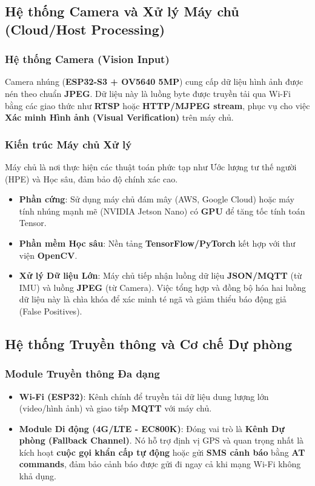 \subsection{Hệ thống Camera và Xử lý Máy chủ (Cloud/Host Processing)}

\subsubsection{Hệ thống Camera (Vision Input)}
Camera nhúng (\textbf{ESP32-S3 + OV5640 5MP}) cung cấp dữ liệu hình ảnh được nén theo chuẩn \textbf{JPEG}. Dữ liệu này là luồng byte được truyền tải qua Wi-Fi bằng các giao thức như \textbf{RTSP} hoặc \textbf{HTTP/MJPEG stream}, phục vụ cho việc \textbf{Xác minh Hình ảnh (Visual Verification)} trên máy chủ.

\subsubsection{Kiến trúc Máy chủ Xử lý}
Máy chủ là nơi thực hiện các thuật toán phức tạp như Ước lượng tư thế người (HPE) và Học sâu, đảm bảo độ chính xác cao.
\begin{itemize}
    \item \textbf{Phần cứng}: Sử dụng máy chủ đám mây (AWS, Google Cloud) hoặc máy tính nhúng mạnh mẽ (NVIDIA Jetson Nano) có \textbf{GPU} để tăng tốc tính toán Tensor.
    \item \textbf{Phần mềm Học sâu}: Nền tảng \textbf{TensorFlow/PyTorch} kết hợp với thư viện \textbf{OpenCV}.
    \item \textbf{Xử lý Dữ liệu Lớn}: Máy chủ tiếp nhận luồng dữ liệu \textbf{JSON/MQTT} (từ IMU) và luồng \textbf{JPEG} (từ Camera). Việc tổng hợp và đồng bộ hóa hai luồng dữ liệu này là chìa khóa để xác minh té ngã và giảm thiểu báo động giả (False Positives).
\end{itemize}

\subsection{Hệ thống Truyền thông và Cơ chế Dự phòng}

\subsubsection{Module Truyền thông Đa dạng}
\begin{itemize}
    \item \textbf{Wi-Fi (ESP32)}: Kênh chính để truyền tải dữ liệu dung lượng lớn (video/hình ảnh) và giao tiếp \textbf{MQTT} với máy chủ.
    \item \textbf{Module Di động (4G/LTE - EC800K)}: Đóng vai trò là \textbf{Kênh Dự phòng (Fallback Channel)}. Nó hỗ trợ định vị GPS và quan trọng nhất là kích hoạt \textbf{cuộc gọi khẩn cấp tự động} hoặc gửi \textbf{SMS cảnh báo} bằng \textbf{AT commands}, đảm bảo cảnh báo được gửi đi ngay cả khi mạng Wi-Fi không khả dụng.
\end{itemize}

